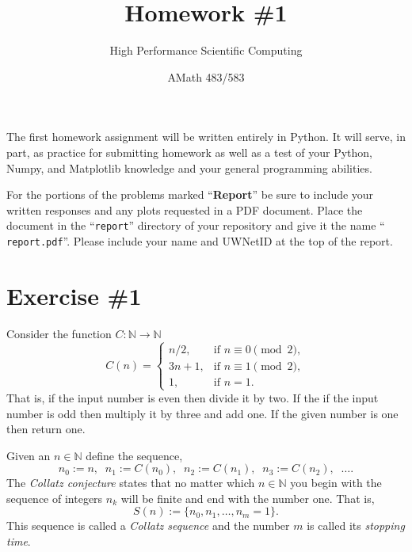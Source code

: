 \documentclass[12pt]{article}
\title{Homework \#1}
\author{High Performance Scientific Computing}
\date{AMath 483/583}
\begin{document}
\maketitle

The first homework assignment will be written entirely in Python. It will serve,
in part, as practice for submitting homework as well as a test of your Python,
Numpy, and Matplotlib knowledge and your general programming abilities.

For the portions of the problems marked ``{\bf Report}'' be sure to include your
written responses and any plots requested in a PDF document. Place the document
in the ``{\tt report}'' directory of your repository and give it the name ``{\tt
  report.pdf}''. Please include your name and UWNetID at the top of the
report.

\section*{Exercise \#1}

Consider the function $C : \mathbb{N} \to \mathbb{N}$
\[
  C(n) = 
  \begin{cases}
    n/2,    & \text{if } n \equiv 0 \pmod{2}, \\
    3n + 1, & \text{if } n \equiv 1 \pmod{2}, \\
    1, & \text{if } n = 1.
  \end{cases}
\]
That is, if the input number is even then divide it by two. If the if the input
number is odd then multiply it by three and add one. If the given number is one
then return one.

Given an $n \in \mathbb{N}$ define the sequence,
\[
  n_0 := n, \;\;
  n_1 := C(n_0), \;\;
  n_2 := C(n_1), \;\;
  n_3 := C(n_2), \;\;
  \ldots.
\]
The {\it Collatz conjecture} states that no matter which $n \in \mathbb{N}$ you
begin with the sequence of integers $n_k$ will be finite and end with the number
one. That is,
\[
  S(n) := \{n_0, n_1, \ldots, n_m = 1\}.
\]
This sequence is called a {\it Collatz sequence} and the number $m$ is called
its {\it stopping time}.
\end{document}

